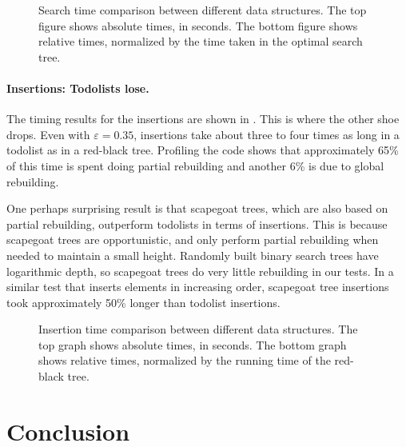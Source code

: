 \documentclass{patmorin}
\newcommand{\eps}{\varepsilon}
\begin{document}
\begin{figure}
  \centering{}
  \centering{}
  \caption{Search time comparison between different data structures. The top figure shows absolute times, in seconds. The bottom figure shows relative times, normalized by the time taken in the optimal search tree.}
\end{figure}

\paragraph{Insertions: Todolists lose.}
The timing results for the insertions are shown in
. This is where the other shoe drops.  Even with
$\eps=0.35$, insertions take about three to four times as long in
a todolist as in a red-black tree.  Profiling the code shows that
approximately 65\% of this time is spent doing partial rebuilding and
another 6\% is due to global rebuilding.

One perhaps surprising result is that scapegoat trees, which are also
based on partial rebuilding, outperform todolists in terms of insertions.
This is because scapegoat trees are opportunistic, and only perform
partial rebuilding when needed to maintain a small height.  Randomly built
binary search trees have logarithmic depth, so scapegoat trees do very
little rebuilding in our tests.  In a similar test that inserts elements
in increasing order, scapegoat tree insertions took approximately 50\%
longer than todolist insertions.


\begin{figure}
  \centering{}
  \centering{}
  \caption{Insertion time comparison between different data structures. The top graph shows absolute times, in seconds. The bottom graph shows relative times, normalized by the running time of the red-black tree.}
\end{figure}

\section{Conclusion}
\end{document}
